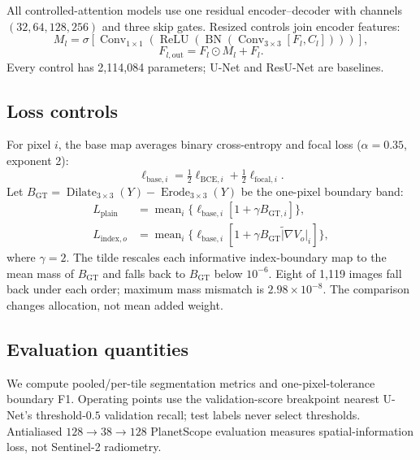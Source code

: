 All controlled-attention models use one residual encoder--decoder with channels
$(32,64,128,256)$ and three skip gates. Resized controls join encoder features:
\begin{equation}
M_l=\sigma\!\left[\operatorname{Conv}_{1\times1}
\left(\operatorname{ReLU}\left(\operatorname{BN}
\left(\operatorname{Conv}_{3\times3}[F_l,C_l]\right)\right)\right)\right],
\end{equation}
\begin{equation}
F_{l,\mathrm{out}}=F_l\odot M_l+F_l.
\end{equation}
Every control has 2,114,084 parameters; U-Net and ResU-Net are baselines.

\subsection{Loss controls}

For pixel $i$, the base map averages binary cross-entropy and focal loss
\citep{lin2017focal} ($\alpha=0.35$, exponent 2):
\begin{equation}
\ell_{\mathrm{base},i}=\tfrac12\ell_{\mathrm{BCE},i}+\tfrac12\ell_{\mathrm{focal},i}.
\end{equation}
Let $B_{\mathrm{GT}}=\operatorname{Dilate}_{3\times3}(Y)-
\operatorname{Erode}_{3\times3}(Y)$ be the one-pixel boundary band:
\begin{align}
L_{\mathrm{plain}} &=
  \operatorname{mean}_i\{\ell_{\mathrm{base},i}[1+\gamma B_{\mathrm{GT},i}]\},\\
L_{\mathrm{index},o} &=
  \operatorname{mean}_i\{\ell_{\mathrm{base},i}[1+\gamma \widetilde{B_{\mathrm{GT}}|\nabla V_o|}_i]\},
\end{align}
where $\gamma=2$. The tilde rescales each informative index-boundary map to
the mean mass of $B_{\mathrm{GT}}$ and falls back to $B_{\mathrm{GT}}$ below
$10^{-6}$. Eight of 1,119 images fall back under each order; maximum mass
mismatch is $2.98\times10^{-8}$. The comparison changes allocation, not mean
added weight.

\subsection{Evaluation quantities}

We compute pooled/per-tile segmentation metrics and one-pixel-tolerance boundary
F1. Operating points use the validation-score breakpoint nearest U-Net's
threshold-$0.5$ validation recall; test labels never select thresholds.
Antialiased $128\!\rightarrow\!38\!\rightarrow\!128$ PlanetScope evaluation
measures spatial-information loss, not Sentinel-2 radiometry.
